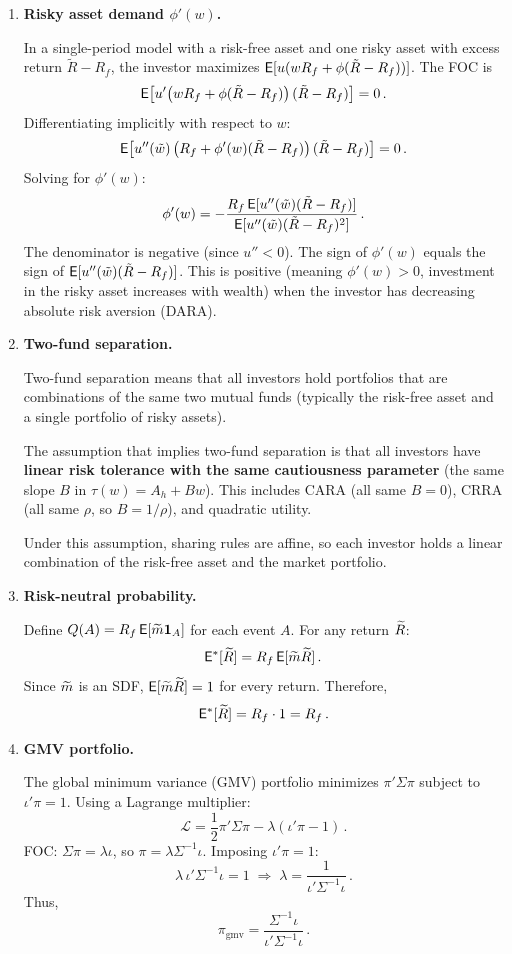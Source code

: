 \begin{enumerate}
\item \textbf{Risky asset demand $\phi'(w)$.}

In a single-period model with a risk-free asset and one risky asset with excess return $\tilde{R}-R_f$, the investor maximizes $\mathsf{E}[u(wR_f + \phi(\tilde{R}-R_f))]$.  The FOC is
\[
\mathsf{E}\!\left[u'\!\left(wR_f + \phi(\tilde{R}-R_f)\right)(\tilde{R}-R_f)\right] = 0\,.
\]
Differentiating implicitly with respect to $w$:
\[
\mathsf{E}\!\left[u''\!\left(\tilde{w}\right)\left(R_f + \phi'(w)(\tilde{R}-R_f)\right)(\tilde{R}-R_f)\right] = 0\,.
\]
Solving for $\phi'(w)$:
\[
\phi'(w) = -\frac{R_f\,\mathsf{E}[u''(\tilde{w})(\tilde{R}-R_f)]}{\mathsf{E}[u''(\tilde{w})(\tilde{R}-R_f)^2]}\,.
\]
The denominator is negative (since $u''<0$).  The sign of $\phi'(w)$ equals the sign of $\mathsf{E}[u''(\tilde{w})(\tilde{R}-R_f)]$.  This is positive (meaning $\phi'(w)>0$, investment in the risky asset increases with wealth) when the investor has decreasing absolute risk aversion (DARA).

\item \textbf{Two-fund separation.}

Two-fund separation means that all investors hold portfolios that are combinations of the same two mutual funds (typically the risk-free asset and a single portfolio of risky assets).

The assumption that implies two-fund separation is that all investors have \textbf{linear risk tolerance with the same cautiousness parameter} (the same slope $B$ in $\tau(w) = A_h + Bw$).  This includes CARA (all same $B=0$), CRRA (all same $\rho$, so $B = 1/\rho$), and quadratic utility.

Under this assumption, sharing rules are affine, so each investor holds a linear combination of the risk-free asset and the market portfolio.

\item \textbf{Risk-neutral probability.}

Define $Q(A) = R_f\,\mathsf{E}[\widetilde{m} \mathbf{1}_A]$ for each event $A$.  For any return $\widetilde{R}$:
\[
\mathsf{E}^*[\widetilde{R}] = R_f\,\mathsf{E}[\widetilde{m}\widetilde{R}]\,.
\]
Since $\widetilde{m}$ is an SDF, $\mathsf{E}[\widetilde{m}\widetilde{R}] = 1$ for every return.  Therefore,
\[
\mathsf{E}^*[\widetilde{R}] = R_f\cdot 1 = R_f\,.
\]

\item \textbf{GMV portfolio.}

The global minimum variance (GMV) portfolio minimizes $\pi'\Sigma\pi$ subject to $\iota'\pi = 1$.  Using a Lagrange multiplier:
\[
\mathcal{L} = \frac{1}{2}\pi'\Sigma\pi - \lambda(\iota'\pi - 1)\,.
\]
FOC: $\Sigma\pi = \lambda\iota$, so $\pi = \lambda\Sigma^{-1}\iota$.  Imposing $\iota'\pi=1$:
\[
\lambda\,\iota'\Sigma^{-1}\iota = 1 \;\Longrightarrow\; \lambda = \frac{1}{\iota'\Sigma^{-1}\iota}\,.
\]
Thus,
\[
\pi_{\mathrm{gmv}} = \frac{\Sigma^{-1}\iota}{\iota'\Sigma^{-1}\iota}\,.
\]


\end{enumerate}
